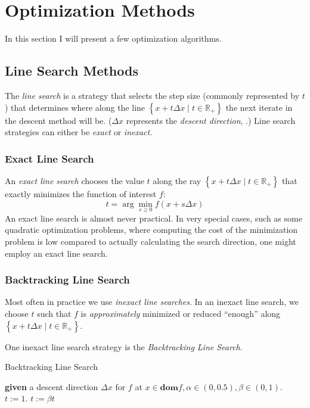 \section{Optimization Methods}

In this section I will present a few optimization algorithms.

\subsection{Line Search Methods}

The \textit{line search} is a strategy that selects the step size (commonly represented by $t$) that determines where along the line $\left\lbrace x+t\Delta x\mid t\in\mathbb{R}_+\right\rbrace$ the next iterate in the descent method will be. ($\Delta x$ represents the \textit{descent direction}, .) Line search strategies can either be \textit{exact} or \textit{inexact}.

\subsubsection*{Exact Line Search}

An \textit{exact line search} chooses the value $t$ along the ray $\left\lbrace x+t\Delta x\mid t\in\mathbb{R}_+\right\rbrace$ that exactly minimizes the function of interest $f$:
$$t=\arg\min_{s\geq 0}f(x+s\Delta x)$$
An exact line search is almost never practical. In very special cases, such as some quadratic optimization problems, where computing the cost of the minimization problem is low compared to actually calculating the search direction, one might employ an exact line search.

\subsubsection*{Backtracking Line Search}
Most often in practice we use \textit{inexact line searches}. In an inexact line search, we choose $t$ such that $f$ is \textit{approximately} minimized or reduced ``enough'' along $\left\lbrace x+t\Delta x\mid t\in\mathbb{R}_+\right\rbrace$.

One inexact line search strategy is the \textit{Backtracking Line Search}.
\begin{algorithm}[H]
	\caption{Backtracking Line Search \cite{Boyd2004}\label{BacktrackingLineSearchAlg}}
	\begin{algorithmic} 
		\State \textbf{given} a descent direction $\Delta x$ for $f$ at $x\in\textbf{dom}f,\alpha\in(0,0.5),\beta\in(0,1)$.
		\State $t:=1$.
		\State $t:=\beta t$
		\EndWhile
	\end{algorithmic}
\end{algorithm}

